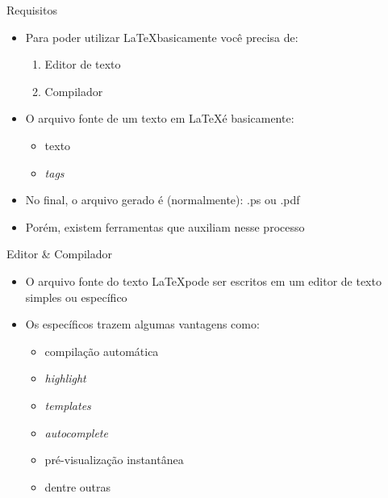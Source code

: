 \begin{frame}{Requisitos}
    \begin{itemize}
        \item Para poder utilizar \LaTeX basicamente você precisa de:
        \begin{enumerate}
            \item Editor de texto
            \item Compilador
        \end{enumerate}

        \item O arquivo fonte de um texto em \LaTeX é basicamente:
        \begin{itemize}
            \item texto
            \item \textit{tags}
        \end{itemize}
    \item No final, o arquivo gerado é (normalmente): .ps ou .pdf
    \item Porém, existem ferramentas que auxiliam nesse processo
    \end{itemize}
\end{frame}

\begin{frame}{Editor \& Compilador}
    \begin{itemize}
        \item O arquivo fonte do texto \LaTeX pode ser escritos em um editor de texto simples ou específico
        
        \item Os específicos trazem algumas vantagens como:
        \begin{itemize}
            \item compilação automática
            \item \textit{highlight}
            \item \textit{templates}
            \item \textit{autocomplete}
            \item pré-visualização instantânea
            \item dentre outras
        \end{itemize}
    \end{itemize}
\end{frame}

